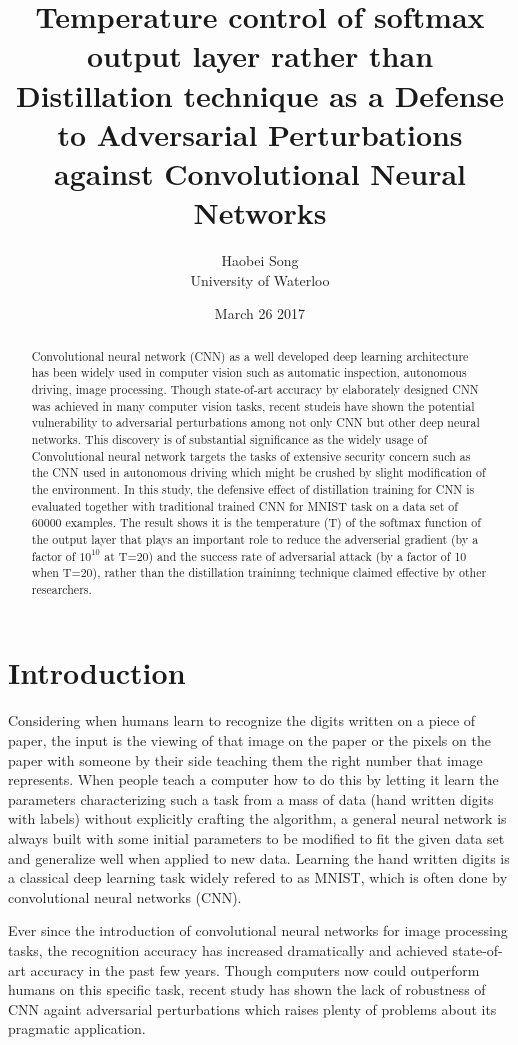 \documentclass{article}
\title{\textbf{Temperature control of softmax output layer rather than Distillation technique as a Defense to Adversarial Perturbations against Convolutional Neural Networks\cite{Papernot}}}
\author{Haobei Song \\
        University of Waterloo}
\date{March 26 2017}
\begin{document}
\maketitle
{}
\newpage
{}

\begin{abstract}
	Convolutional neural network (CNN) as a well developed deep learning architecture has been widely used in computer vision such as automatic inspection, autonomous driving, image processing. 
	Though state-of-art accuracy by elaborately designed CNN was achieved in many computer vision tasks, 
	recent studeis have shown the potential vulnerability to adversarial perturbations among not only CNN but other deep neural networks.
	This discovery is of substantial significance as the widely usage of Convolutional neural network targets the tasks of extensive security concern
	such as the CNN used in autonomous driving which might be crushed by slight modification of the environment. 
	In this study, the defensive effect of distillation training for CNN is evaluated together with traditional trained CNN for MNIST task on a data set of 60000 examples.
The result shows it is the temperature (T) of the softmax function of the output layer that plays an important role to reduce the adverserial gradient (by a factor of $10^10$ at T=20) and the success rate of adversarial attack (by a factor of 10 when T=20),
 rather than the distillation traininng technique claimed effective by other researchers.
\end{abstract}
\section{Introduction}
Considering when humans learn to recognize the digits written on a piece of paper, the input is the viewing of that image on the paper or the pixels on the paper with someone by their side teaching them the right number that image represents.
When people teach a computer how to do this by letting it learn the parameters characterizing such a task from a mass of data (hand written digits with labels) without explicitly crafting the algorithm, 
a general neural network is always built with some initial parameters to be modified to fit the given data set and generalize well when applied to new data. Learning the hand written digits is a classical deep learning task widely refered to as MNIST, which is often done by convolutional neural networks (CNN).

Ever since the introduction of convolutional neural networks for image processing tasks, the recognition accuracy has increased dramatically and achieved state-of-art accuracy in the past few years. Though computers now could outperform humans on this specific task,
recent study has shown the lack of robustness of CNN againt adversarial perturbations which raises plenty of problems about its pragmatic application. 
\end{document}
